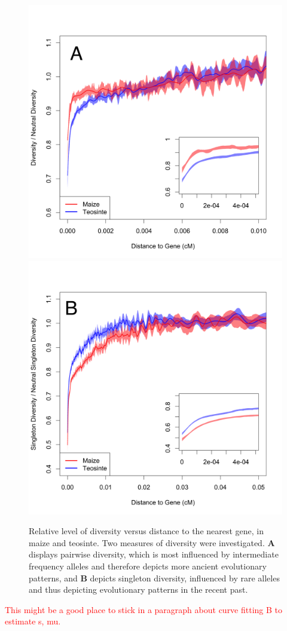 \documentclass{pnastwo}
\begin{document}
\begin{article}
\begin{figure}[b]
\centering
\includegraphics[width=.45\textwidth]{FigsAndFiles/distanceToGene_WithSignificance_Folded2_manuscript.png} \includegraphics[width=.45\textwidth]{FigsAndFiles/distanceToGene_WithSignificance_Singletons_manuscript.png}
\caption{Relative level of diversity versus distance to the nearest
  gene, in maize and teosinte. Two measures of diversity were
  investigated. \textbf{A} displays pairwise
  diversity, which is most influenced by intermediate frequency
  alleles and therefore depicts more ancient evolutionary patterns,
  and \textbf{B} depicts singleton diversity, influenced by rare
  alleles and thus depicting evolutionary patterns in the recent past.}
\label{purify}
\end{figure}


\textcolor{red}{This might be a good place to stick in a paragraph
  about curve fitting B to estimate s, mu.}


\end{article}
\end{document}
